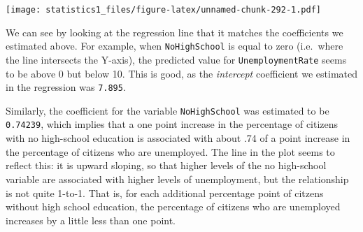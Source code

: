 \documentclass[]{article}
\newenvironment{Shaded}{\begin{snugshade}}{\end{snugshade}}
\newcommand{\KeywordTok}[1]{\textcolor[rgb]{0.13,0.29,0.53}{\textbf{#1}}}
\newcommand{\DataTypeTok}[1]{\textcolor[rgb]{0.13,0.29,0.53}{#1}}
\newcommand{\DecValTok}[1]{\textcolor[rgb]{0.00,0.00,0.81}{#1}}
\newcommand{\StringTok}[1]{\textcolor[rgb]{0.31,0.60,0.02}{#1}}
\newcommand{\OtherTok}[1]{\textcolor[rgb]{0.56,0.35,0.01}{#1}}
\newcommand{\OperatorTok}[1]{\textcolor[rgb]{0.81,0.36,0.00}{\textbf{#1}}}
\newcommand{\NormalTok}[1]{#1}
\theoremstyle{definition}
\theoremstyle{definition}
\theoremstyle{definition}
\theoremstyle{remark}
\begin{document}
\begin{Shaded}
\end{Shaded}

\texttt{[image: statistics1\_files/figure-latex/unnamed-chunk-292-1.pdf]}

We can see by looking at the regression line that it matches the
coefficients we estimated above. For example, when \texttt{NoHighSchool}
is equal to zero (i.e.~where the line intersects the Y-axis), the
predicted value for \texttt{UnemploymentRate} seems to be above 0 but
below 10. This is good, as the \emph{intercept} coefficient we estimated
in the regression was \texttt{7.895}.

Similarly, the coefficient for the variable \texttt{NoHighSchool} was
estimated to be \texttt{0.74239}, which implies that a one point
increase in the percentage of citizens with no high-school education is
associated with about .74 of a point increase in the percentage of
citizens who are unemployed. The line in the plot seems to reflect this:
it is upward sloping, so that higher levels of the no high-school
variable are associated with higher levels of unemployment, but the
relationship is not quite 1-to-1. That is, for each additional
percentage point of citzens without high school education, the
percentage of citizens who are unemployed increases by a little less
than one point.
\end{document}
